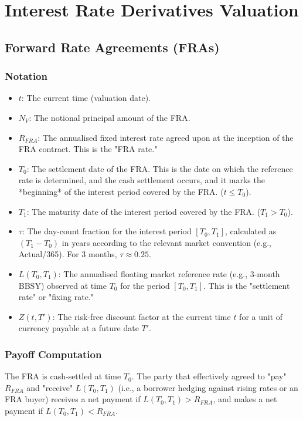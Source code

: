\documentclass[11pt, a4paper, british]{article}
\begin{document}
\section{Interest Rate Derivatives Valuation}

\subsection{Forward Rate Agreements (FRAs)}

\subsubsection{Notation}
\begin{itemize}
 \item $t$: The current time (valuation date).
 \item $N_V$: The notional principal amount of the FRA.
 \item $R_{FRA}$: The annualised fixed interest rate agreed upon at the inception of the FRA contract. This is the "FRA rate."
 \item $T_0$: The settlement date of the FRA. This is the date on which the reference rate is determined, and the cash settlement occurs, and it marks the *beginning* of the interest period covered by the FRA. ($t \le T_0$).
 \item $T_1$: The maturity date of the interest period covered by the FRA. ($T_1 > T_0$).
 \item $\tau$: The day-count fraction for the interest period $[T_0, T_1]$, calculated as $(T_1 - T_0)$ in years according to the relevant market convention (e.g., Actual/365). For 3 months, $\tau \approx 0.25$.
 \item $L(T_0, T_1)$: The annualised floating market reference rate (e.g., 3-month BBSY) observed at time $T_0$ for the period $[T_0, T_1]$. This is the "settlement rate" or "fixing rate."
 \item $Z(t, T')$: The risk-free discount factor at the current time $t$ for a unit of currency payable at a future date $T'$.
\end{itemize}

\subsubsection{Payoff Computation}

The FRA is cash-settled at time $T_0$. The party that effectively agreed to "pay" $R_{FRA}$ and "receive" $L(T_0, T_1)$ (i.e., a borrower hedging against rising rates or an FRA buyer) receives a net payment if $L(T_0, T_1) > R_{FRA}$, and makes a net payment if $L(T_0, T_1) < R_{FRA}$.
\end{document}
